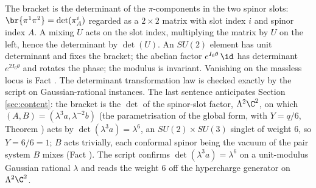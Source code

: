 The bracket is the determinant of the $\pi$-components in the two spinor slots: $\br{\pi^{1}\pi^{2}} = \det(\pi^{i}_{A})$ regarded as a $2 \times 2$ matrix with slot index $i$ and spinor index $A$. A mixing $U$ acts on the slot index, multiplying the matrix by $U$ on the left, hence the determinant by $\det(U)$. An $SU(2)$ element has unit determinant and fixes the bracket; the abelian factor $e^{I_{6}\theta}\,\id$ has determinant $e^{2I_{6}\theta}$ and rotates the phase; the modulus is invariant. Vanishing on the massless locus is Fact . The determinant transformation law is checked exactly by the script on Gaussian-rational instances. The last sentence anticipates Section \ref{sec:content}: the bracket is the $\det$ of the spinor-slot factor, $\Lambda^{2}\C^{2}$, on which $(A, B) = (\lambda^{3}a, \lambda^{-2}b)$ (the parametrisation of the global form, with $Y = q/6$, Theorem ) acts by $\det(\lambda^{3}a) = \lambda^{6}$, an $SU(2) \times SU(3)$ singlet of weight $6$, so $Y = 6/6 = 1$; $B$ acts trivially, each conformal spinor being the vacuum of the pair system $B$ mixes (Fact ). The script confirms $\det(\lambda^{3}a) = \lambda^{6}$ on a unit-modulus Gaussian rational $\lambda$ and reads the weight $6$ off the hypercharge generator on $\Lambda^{2}\C^{2}$.
